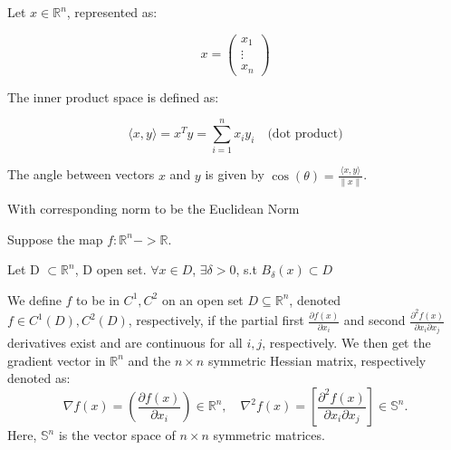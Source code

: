 \begin{definition}
    Let $x \in \mathbb{R}^n$, represented as:
    
    \[
    x = \begin{pmatrix}
        x_1 \\
        \vdots \\
        x_n
    \end{pmatrix}
    \]
    
    The inner product space is defined as:
    
    \[
    \langle x, y \rangle = x^T y = \sum_{i=1}^{n} x_i y_i \quad \text{(dot product)}
    \]

    The angle between vectors $x$ and $y$ is given by $\cos(\theta) = \frac{\langle x, y \rangle}{\|x\|}$.

    With corresponding norm to be the Euclidean Norm
\end{definition}



\begin{definition}[map]
    Suppose the map $f:\mathbb{R}^n -> \mathbb{R}$.
\end{definition}

\begin{definition}
    Let D $\subset \mathbb{R}^n$, D open set. $\forall x \in D$, $\exists \delta >0$, s.t $B_{\delta}(x)\subset D$
\end{definition}

\begin{definition}[differ]
    We define \(f\) to be in \(C^1, C^2\) on an open set \(D \subseteq \mathbb{R}^n\), denoted \(f \in C^1(D), C^2(D)\), respectively, if the partial first \(\frac{\partial f(x)}{\partial x_i}\) and second \(\frac{\partial^2 f(x)}{\partial x_i \partial x_j}\) derivatives exist and are continuous for all \(i, j\), respectively. We then get the gradient vector in \(\mathbb{R}^n\) and the \(n \times n\) symmetric Hessian matrix, respectively denoted as:
\[
\nabla f(x) = \left( \frac{\partial f(x)}{\partial x_i} \right) \in \mathbb{R}^n, \quad \nabla^2 f(x) = \left[ \frac{\partial^2 f(x)}{\partial x_i \partial x_j} \right] \in \mathbb{S}^n.
\]
Here, \(\mathbb{S}^n\) is the vector space of \(n \times n\) symmetric matrices.

\end{definition}


